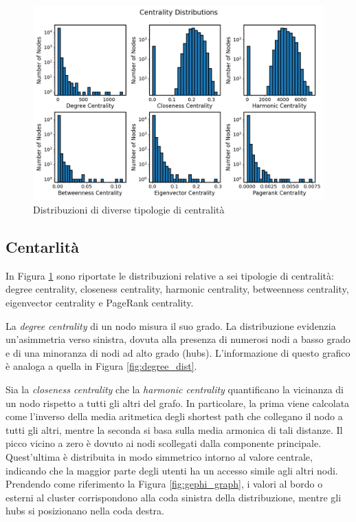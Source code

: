 \documentclass[sigchi]{acmart}
\begin{document}
\begin{figure}[h]
    \centering
    \includegraphics[width=\linewidth]{img/Centrality.png}
    \caption{Distribuzioni di diverse tipologie di centralità} \label{fig:centrality}
\end{figure}

\subsection{Centarlità}
In Figura \ref{fig:centrality} sono riportate le distribuzioni relative a sei tipologie di centralità: degree centrality, closeness centrality, harmonic centrality, betweenness centrality, eigenvector centrality e PageRank centrality.

La \textit{degree centrality} di un nodo misura il suo grado. La distribuzione evidenzia un'asimmetria verso sinistra, dovuta alla presenza di numerosi nodi a basso grado e di una minoranza di nodi ad alto grado (hubs). L'informazione di questo grafico è analoga a quella in Figura \ref{fig:degree_dist}.

Sia la \textit{closeness centrality} che la \textit{harmonic centrality} quantificano la vicinanza di un nodo rispetto a tutti gli altri del grafo. In particolare, la prima viene calcolata come l’inverso della media aritmetica degli shortest path che collegano il nodo a tutti gli altri, mentre la seconda si basa sulla media armonica di tali distanze. Il picco vicino a zero è dovuto ai nodi scollegati dalla componente principale. Quest'ultima è distribuita in modo simmetrico intorno al valore centrale, indicando che la maggior parte degli utenti ha un accesso simile agli altri nodi. Prendendo come riferimento la Figura \ref{fig:gephi_graph}, i valori al bordo o esterni al cluster corrispondono alla coda sinistra della distribuzione, mentre gli hubs si posizionano nella coda destra.
\end{document}
